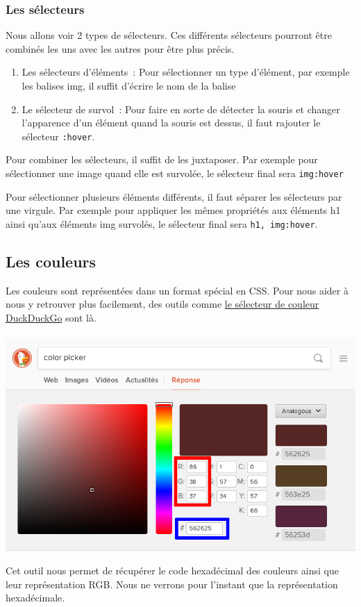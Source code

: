 \subsubsection{Les sélecteurs}
Nous allons voir 2 types de sélecteurs. Ces différents sélecteurs pourront être
combinés les uns avec les autres pour être plus précis.
\begin{enumerate}
	\item Les sélecteurs d’éléments : Pour sélectionner un type d'élément,
		par exemple les balises img, il suffit d'écrire le nom de la
		balise
	\item Le sélecteur de survol : Pour faire en sorte de détecter la souris
		et changer l’apparence d’un élément quand la souris est dessus,
		il faut rajouter le sélecteur \texttt{:hover}.
\end{enumerate}
Pour combiner les sélecteurs, il suffit de les juxtaposer. Par exemple pour
sélectionner une image quand elle est survolée, le sélecteur final sera
\texttt{img:hover}

Pour sélectionner plusieurs éléments différents, il faut séparer les sélecteurs
par une virgule. Par exemple pour appliquer les mêmes propriétés aux éléments h1
ainsi qu'aux éléments img survolés, le sélecteur final sera
\texttt{h1, img:hover}.

\subsection{Les couleurs}
Les couleurs sont représentées dans un format spécial en CSS. Pour nous aider à
nous y retrouver plus facilement, des outils comme
\href{https://duckduckgo.com/?q=color+picker\&t=ffab\&ia=answer}{le sélecteur de couleur DuckDuckGo} sont là.
\paragraph{}
\begin{center}\includegraphics[width=.8\linewidth]{img/ddgo_color_picker.png}\end{center}
Cet outil nous permet de récupérer le code \colorbox{blue!30}{hexadécimal} des
couleurs ainsi que leur représentation \colorbox{red!30}{RGB}. Nous ne verrons
pour l'instant que la représentation hexadécimale.

